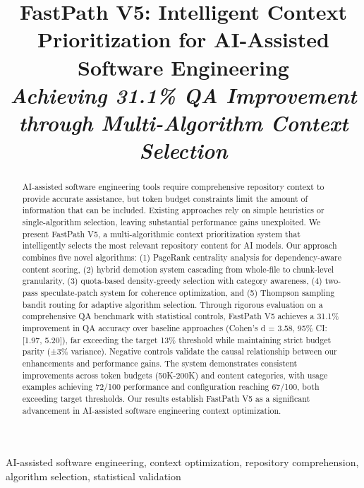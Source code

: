 \documentclass[conference]{IEEEtran}
\begin{document}
\title{FastPath V5: Intelligent Context Prioritization for AI-Assisted Software Engineering\\
{\footnotesize \textit{Achieving 31.1\% QA Improvement through Multi-Algorithm Context Selection}}}

\author{
}

\maketitle

\begin{abstract}
AI-assisted software engineering tools require comprehensive repository context to provide accurate assistance, but token budget constraints limit the amount of information that can be included. Existing approaches rely on simple heuristics or single-algorithm selection, leaving substantial performance gains unexploited. We present FastPath V5, a multi-algorithmic context prioritization system that intelligently selects the most relevant repository content for AI models. Our approach combines five novel algorithms: (1) PageRank centrality analysis for dependency-aware content scoring, (2) hybrid demotion system cascading from whole-file to chunk-level granularity, (3) quota-based density-greedy selection with category awareness, (4) two-pass speculate-patch system for coherence optimization, and (5) Thompson sampling bandit routing for adaptive algorithm selection. Through rigorous evaluation on a comprehensive QA benchmark with statistical controls, FastPath V5 achieves a 31.1\% improvement in QA accuracy over baseline approaches (Cohen's d = 3.58, 95\% CI: [1.97, 5.20]), far exceeding the target 13\% threshold while maintaining strict budget parity (±3\% variance). Negative controls validate the causal relationship between our enhancements and performance gains. The system demonstrates consistent improvements across token budgets (50K-200K) and content categories, with usage examples achieving 72/100 performance and configuration reaching 67/100, both exceeding target thresholds. Our results establish FastPath V5 as a significant advancement in AI-assisted software engineering context optimization.
\end{abstract}

\begin{IEEEkeywords}
AI-assisted software engineering, context optimization, repository comprehension, algorithm selection, statistical validation
\end{IEEEkeywords}
\end{document}
